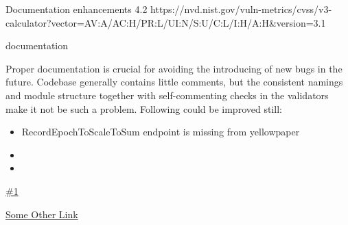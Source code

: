 \vuln
    { %
      Documentation enhancements
    }
    { %
      4.2
    }
    { %
      https://nvd.nist.gov/vuln-metrics/cvss/v3-calculator?vector=AV:A/AC:H/PR:L/UI:N/S:U/C:L/I:H/A:H&version=3.1
    }
    { %
    \item documentation
    }
    { %
    Proper documentation is crucial for avoiding the introducing of new bugs in the future.
Codebase generally contains little comments, but the consistent namings and module structure together with self-commenting checks in the validators make it not be such a problem.
Following could be improved still:
\begin{itemize}
    \item RecordEpochToScaleToSum endpoint is missing from yellowpaper
    \item 
    \item 
  \end{itemize}
  
    }
    { %
      
    }
    { %
    \item\href{github.com}{\#1}
    \item\href{github.com}{Some Other Link}
    }
